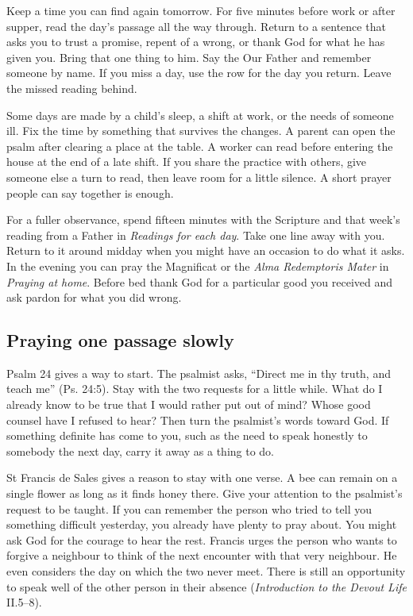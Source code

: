 Keep a time you can find again tomorrow. For five minutes before work or
after supper, read the day's passage all the way through. Return to a
sentence that asks you to trust a promise, repent of a wrong, or thank God
for what he has given you. Bring that one thing to him. Say the Our Father
and remember someone by name. If you miss a day, use the row for the day you return. Leave the missed reading behind.

Some days are made by a child's sleep, a shift at work, or the needs of
someone ill. Fix the time by something that survives the changes. A parent
can open the psalm after clearing a place at the table. A worker can read
before entering the house at the end of a late shift. If you share the
practice with others, give someone else a turn to read, then leave room
for a little silence. A short prayer people can say together is enough.

For a fuller observance, spend fifteen minutes with the Scripture and that
week's reading from a Father in \emph{Readings for each day}. Take one line
away with you. Return to it around midday when you might have an occasion
to do what it asks. In the evening you can pray the Magnificat or the
\emph{Alma Redemptoris Mater} in \emph{Praying at home}. Before bed thank God
for a particular good you received and ask pardon for what you did wrong.

\subsection{Praying one passage slowly}

Psalm 24 gives a way to start. The psalmist asks, “Direct me in thy truth,
and teach me” (Ps. 24:5). Stay with the two requests for a little while.
What do I already know to be true that I would rather put out of mind?
Whose good counsel have I refused to hear? Then turn the psalmist's words
toward God. If something definite has come to you, such as the need to
speak honestly to somebody the next day, carry it away as a thing to do.

St Francis de Sales gives a reason to stay with one verse. A bee can
remain on a single flower as long as it finds honey there. Give your
attention to the psalmist's request to be taught. If you can remember
the person who tried to tell you something difficult yesterday, you
already have plenty to pray about. You might ask God for the courage
to hear the rest. Francis urges the person who wants to forgive a
neighbour to think of the next encounter with that very neighbour.
He even considers the day on which the two never meet. There is still
an opportunity to speak well of the other person in their absence
(\emph{Introduction to the Devout Life} II.5--8).


